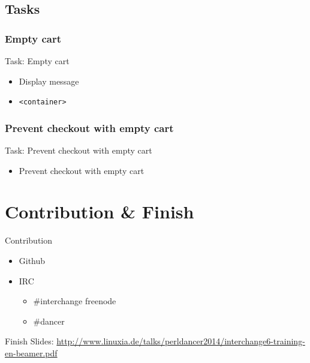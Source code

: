 \subsection{Tasks}
\subsubsection{Empty cart}
\begin{frame}[fragile]{Task: Empty cart}
\begin{itemize}
\item Display message 
\item \verb|<container>|
\end{itemize}
\end{frame}

\subsubsection{Prevent checkout with empty cart}
\begin{frame}{Task: Prevent checkout with empty cart}
\begin{itemize}
\item Prevent checkout with empty cart
\end{itemize}
\end{frame}

\section{Contribution \& Finish}
\begin{frame}{Contribution}
\begin{itemize}
\item Github
\item IRC 
\begin{itemize}
\item \#interchange freenode
\item \#dancer
\end{itemize}
\end{itemize}
\end{frame}

\begin{frame}{Finish}
Slides:
\url{http://www.linuxia.de/talks/perldancer2014/interchange6-training-en-beamer.pdf}
\end{frame}



